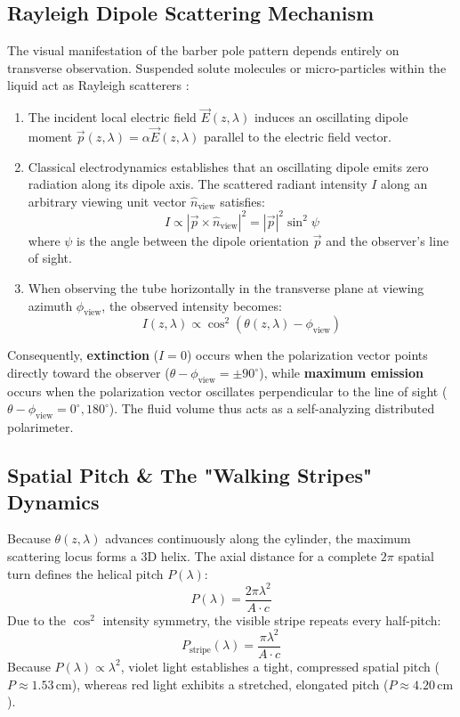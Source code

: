 \documentclass[twocolumn,10pt,a4paper]{article}
\begin{document}
\subsection{Rayleigh Dipole Scattering Mechanism}
The visual manifestation of the barber pole pattern depends entirely on transverse observation. Suspended solute molecules or micro-particles within the liquid act as Rayleigh scatterers \cite{hecht2017}:
\begin{enumerate}[leftmargin=*]
  \item The incident local electric field $\vec{E}(z, \lambda)$ induces an oscillating dipole moment $\vec{p}(z, \lambda) = \alpha \vec{E}(z, \lambda)$ parallel to the electric field vector.
  \item Classical electrodynamics establishes that an oscillating dipole emits zero radiation along its dipole axis. The scattered radiant intensity $I$ along an arbitrary viewing unit vector $\hat{n}_{\text{view}}$ satisfies:
  \begin{equation}
    I \propto |\vec{p} \times \hat{n}_{\text{view}}|^2 = |\vec{p}|^2 \sin^2\psi
    \label{eq:dipole_pattern}
  \end{equation}
  where $\psi$ is the angle between the dipole orientation $\vec{p}$ and the observer's line of sight.
  \item When observing the tube horizontally in the transverse plane at viewing azimuth $\phi_{\text{view}}$, the observed intensity becomes:
  \begin{equation}
    I(z, \lambda) \propto \cos^2\left(\theta(z, \lambda) - \phi_{\text{view}}\right)
    \label{eq:transverse_intensity}
  \end{equation}
\end{enumerate}
Consequently, \textbf{extinction} ($I = 0$) occurs when the polarization vector points directly toward the observer ($\theta - \phi_{\text{view}} = \pm 90^\circ$), while \textbf{maximum emission} occurs when the polarization vector oscillates perpendicular to the line of sight ($\theta - \phi_{\text{view}} = 0^\circ, 180^\circ$). The fluid volume thus acts as a self-analyzing distributed polarimeter.

\subsection{Spatial Pitch \& The "Walking Stripes" Dynamics}
Because $\theta(z, \lambda)$ advances continuously along the cylinder, the maximum scattering locus forms a 3D helix. The axial distance for a complete $2\pi$ spatial turn defines the helical pitch $P(\lambda)$:
\begin{equation}
  P(\lambda) = \frac{2\pi \lambda^2}{A \cdot c}
  \label{eq:helical_pitch}
\end{equation}
Due to the $\cos^2$ intensity symmetry, the visible stripe repeats every half-pitch:
\begin{equation}
  P_{\text{stripe}}(\lambda) = \frac{\pi \lambda^2}{A \cdot c}
  \label{eq:stripe_pitch}
\end{equation}
Because $P(\lambda) \propto \lambda^2$, violet light establishes a tight, compressed spatial pitch ($P \approx 1.53\,\text{cm}$), whereas red light exhibits a stretched, elongated pitch ($P \approx 4.20\,\text{cm}$).
\end{document}
